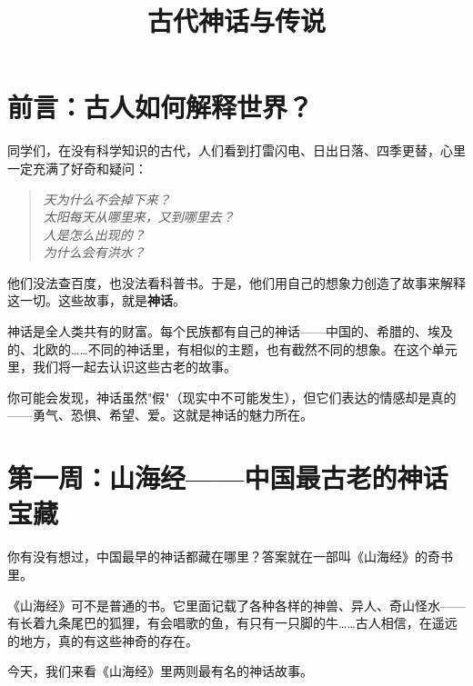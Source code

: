 \documentclass[a4paper,12pt]{ctexart}
\title{\textcolor{blue!70!black}{\Huge\textbf{古代神话与传说}}}
\author{}
\date{}
\begin{document}
\maketitle
\thispagestyle{empty}

\section*{\textcolor{blue!70!black}{前言：古人如何解释世界？}}

同学们，在没有科学知识的古代，人们看到打雷闪电、日出日落、四季更替，心里一定充满了好奇和疑问：

\vspace{0.2cm}
\begin{quote}
\large
\textit{天为什么不会掉下来？} \\
\textit{太阳每天从哪里来，又到哪里去？} \\
\textit{人是怎么出现的？} \\
\textit{为什么会有洪水？}
\end{quote}
\vspace{0.2cm}

他们没法查百度，也没法看科普书。于是，他们用自己的想象力创造了故事来解释这一切。这些故事，就是\textbf{神话}。

神话是全人类共有的财富。每个民族都有自己的神话——中国的、希腊的、埃及的、北欧的……不同的神话里，有相似的主题，也有截然不同的想象。在这个单元里，我们将一起去认识这些古老的故事。

你可能会发现，神话虽然"假"（现实中不可能发生），但它们表达的情感却是真的——勇气、恐惧、希望、爱。这就是神话的魅力所在。

\newpage

\section*{\textcolor{orange!80!black}{第一周：山海经——中国最古老的神话宝藏}}

你有没有想过，中国最早的神话都藏在哪里？答案就在一部叫《山海经》的奇书里。

《山海经》可不是普通的书。它里面记载了各种各样的神兽、异人、奇山怪水——有长着九条尾巴的狐狸，有会唱歌的鱼，有只有一只脚的牛……古人相信，在遥远的地方，真的有这些神奇的存在。

今天，我们来看《山海经》里两则最有名的神话故事。

\vspace{0.5cm}
\end{document}
